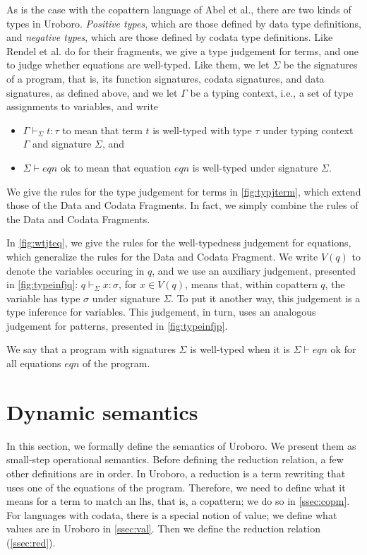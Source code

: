 As is the case with the copattern language of Abel et al.\cite{abel13copatterns}, there are two kinds of types in Uroboro. \textit{Positive types}, which are those defined by data type definitions, and \textit{negative types}, which are those defined by codata type definitions. Like Rendel et al. do for their fragments, we give a type judgement for terms, and one to judge whether equations are well-typed.  Like them, we let $\Sigma$ be the signatures of a program, that is, its function signatures, codata signatures, and data signatures, as defined above, and we let $\Gamma$ be a typing context, i.e., a set of type assignments to variables, and write
\begin{itemize}
\item $\Gamma \vdash_{\Sigma} t : \tau$ to mean that term $t$ is well-typed with type $\tau$ under typing context $\Gamma$ and signature $\Sigma$, and

\item $\Sigma \vdash eqn \textrm{ ok}$ to mean that equation $eqn$ is well-typed under signature $\Sigma$.
\end{itemize}
We give the rules for the type judgement for terms in \autoref{fig:typjterm}, which extend those of the Data and Codata Fragments. In fact, we simply combine the rules of the Data and Codata Fragments.

In \autoref{fig:wtjteq}, we give the rules for the well-typedness judgement for equations, which generalize the rules for the Data and Codata Fragment. We write $V(q)$ to denote the variables occuring in $q$, and we use an auxiliary judgement, presented in \autoref{fig:typeinfjq}: $q \vdash_{\Sigma} x : \sigma$, for $x \in V(q)$,  means that, within copattern $q$, the variable has type $\sigma$ under signature $\Sigma$. To put it another way, this judgement is a type inference for variables. This judgement, in turn, uses an analogous judgement for patterns, presented in \autoref{fig:typeinfjp}.

We say that a program with signatures $\Sigma$ is well-typed when it is $\Sigma \vdash eqn \textrm{ ok}$ for all equations $eqn$ of the program.

\section{Dynamic semantics}
\label{sec:urosos}

In this section, we formally define the semantics of Uroboro. We present them as small-step operational semantics. Before defining the reduction relation, a few other definitions are in order. In Uroboro, a reduction is a term rewriting that uses one of the equations of the program. Therefore, we need to define what it means for a term to match an lhs, that is, a copattern; we do so in \autoref{ssec:copm}. For languages with codata, there is a special notion of value; we define what values are in Uroboro in \autoref{ssec:val}. Then we define the reduction relation (\autoref{ssec:red}).

